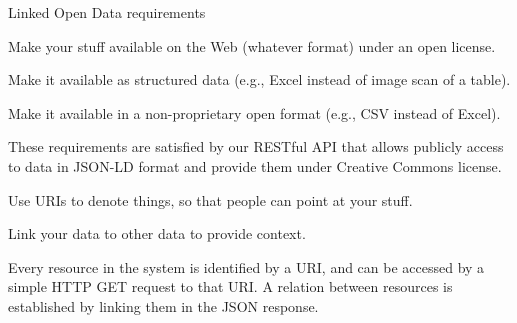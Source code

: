 \begin{frame}[allowframebreaks]{Linked Open Data\autocite{Berners-Lee_2006} requirements}
	\begin{block}{\faStar\faStarO\faStarO\faStarO\faStarO}
		Make your stuff available on the Web (whatever format) under an open
		license.
	\end{block}
	\vspace*{-8pt}
	\begin{block}{\faStar\faStar\faStarO\faStarO\faStarO}
		Make it available as structured data (e.g., Excel instead of image scan
		of a table).
	\end{block}
	\vspace*{-8pt}
	\begin{block}{\faStar\faStar\faStar\faStarO\faStarO}
		Make it available in a non-proprietary open format (e.g., CSV instead of
		Excel).
	\end{block}
	These requirements are satisfied by our RESTful API that allows
	publicly access to data in JSON-LD\autocite{Sporny_2014} format and provide
	them under Creative Commons license.

	\framebreak

	\begin{block}{\faStar\faStar\faStar\faStar\faStarO}
		Use URIs to denote things, so that people can point at your stuff.
	\end{block}
	\vspace*{-8pt}
	\begin{block}{\faStar\faStar\faStar\faStar\faStar}
		Link your data to other data to provide context.
	\end{block}
	Every resource in the system is identified by a URI, and can be accessed
	by a simple HTTP GET request to that URI. A relation between resources
	is established by linking them in the JSON response.
\end{frame}

